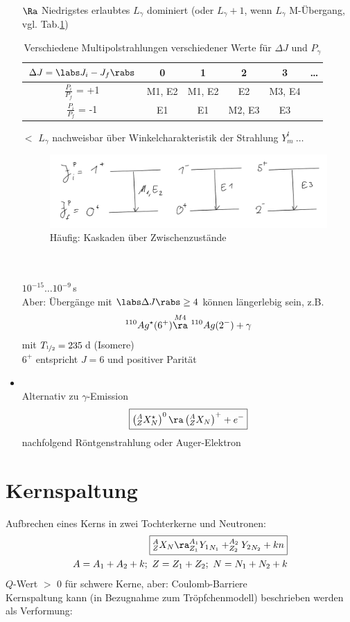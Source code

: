 \begin{itemize}
\item[$\Ra$] Niedrigstes erlaubtes $L_\gamma$ dominiert (oder $L_\gamma +1$, wenn $L_\gamma$ M-Übergang, vgl. Tab.\ref{tab:5.1})
\begin{table}[!ht]
\centering
\begin{tabular}{c|c|c|c|c|c}
$\Delta J = \labs J_i - J_f \rabs$ & 0 & 1 & 2 & 3 & \dots \\
\hline
$\frac{P_i}{P_f}$ = +1 & M1, E2 & M1, E2 & E2 & M3, E4 \\
$\frac{P_i}{P_f}$ = -1 & E1 & E1 & M2, E3 & E3 \\
\hline
\end{tabular}
\caption{Verschiedene Multipolstrahlungen verschiedener Werte für $\Delta J$ und $P_\gamma$ \label{tab:5.1}}
\end{table}

\item[$\lt$] $L_\gamma$ nachweisbar über Winkelcharakteristik der Strahlung $Y^l_m\ \dots$
\begin{figure}[!ht]
\centering
\includegraphics[width=.5\textwidth]{imgs/ep5-fig-5-14.pdf}
\caption{Häufig: Kaskaden über Zwischenzustände\label{fig:5.14}}
\end{figure}\\
\\
$10^{-15} \dots 10^{-9}$\,s\\
Aber: Übergänge mit $\labs \Delta J \rabs \geq 4$ können längerlebig sein, z.B. 
\begin{align*}
^{110}Ag^\star (6^+) \overset{M4}{\ra}\ ^{110}Ag(2^-) + \gamma
\end{align*}
mit $T_{\nicefrac{1}{2}} = 235$\,d (\glqq Isomere\grqq)\\
 $6^+$ entspricht $J=6$ und positiver Parität
\item {}\\
Alternativ zu $\gamma$-Emission
\begin{align}
\boxed{\left( ^A_Z X^\star_N \right)^0 \ra \left( ^A_Z X_N \right)^+ + e^-}
\end{align}
nachfolgend Röntgenstrahlung oder Auger-Elektron
\end{itemize}


\section{Kernspaltung}
Aufbrechen eines Kerns in zwei Tochterkerne und Neutronen:
\begin{align*}
\boxed{^A_ZX_N \ra ^{A_1}_{Z_1}{Y_1}_{N_1} + ^{A_2}_{Z_2}{Y_2}_{N_2} + kn}\\
A = A_1 + A_2 + k; \ Z = Z_1 + Z_2; \ N = N_1 + N_2 +k
\end{align*}
$Q$-Wert $>$ 0 für schwere Kerne, aber: Coulomb-Barriere\\
Kernspaltung kann (in Bezugnahme zum Tröpfchenmodell) beschrieben werden als Verformung:

